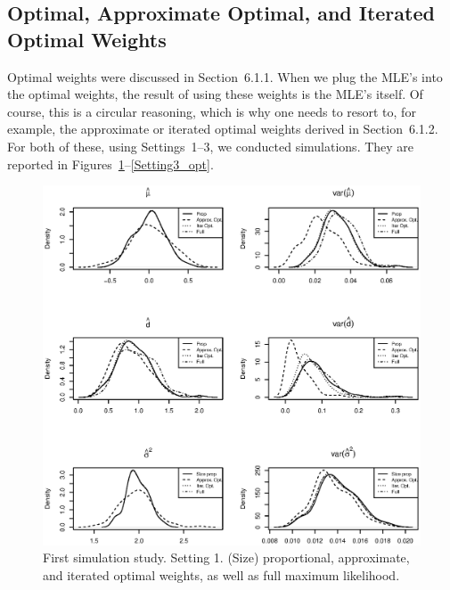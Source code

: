 \documentclass[11pt,a5paper,twoside]{book}
\begin{document}
{\subsection{Optimal, Approximate Optimal, and Iterated Optimal Weights}

Optimal weights were discussed in Section~6.1.1.
When we plug the MLE's into the optimal weights, the result of using these weights is the MLE's itself. Of course, this is a circular reasoning, which is why one needs to resort to, for example, the approximate or iterated optimal weights derived in Section~6.1.2.
For both of these, using Settings~1--3, we conducted simulations. They are reported in Figures~\ref{Setting1_opt}--\ref{Setting3_opt}.
\begin{figure}[!t]
\centering
\includegraphics[width=\textwidth]{aSetting1_opt.eps}
\caption{\small \linespread{1.1} First simulation study. Setting 1. (Size) proportional, approximate, and iterated optimal weights, as well as full maximum likelihood.} \label{Setting1_opt}
\end{figure}
\begin{figure}[!t]
\centering

\end{figure}}
\end{document}
